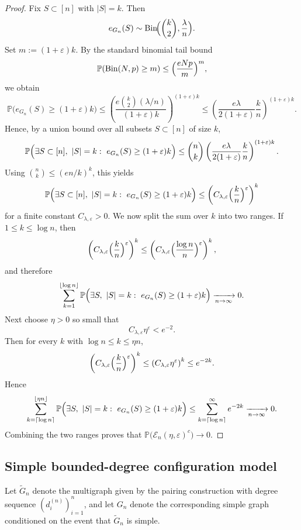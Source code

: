 \documentclass[11pt]{article}
\theoremstyle{remark}
\theoremstyle{plain}
\newcommand{\Pbb}{\mathbb{P}}
\newcommand{\1}{\mathbbm{1}}
\begin{document}
\begin{proof}
Fix \(S\subset[n]\) with \(|S|=k\). Then
\[
e_{G_n}(S)\sim \mathrm{Bin}\!\Bigl(\binom{k}{2},\frac{\lambda}{n}\Bigr).
\]
Set \(m:=(1+\varepsilon)k\). By the standard binomial tail bound
\[
\Pbb(\mathrm{Bin}(N,p)\ge m)\le \Bigl(\frac{eNp}{m}\Bigr)^m,
\]
we obtain
\[
\Pbb\bigl(e_{G_n}(S)\ge (1+\varepsilon)k\bigr)
\le
\left(
\frac{e\binom{k}{2}(\lambda/n)}{(1+\varepsilon)k}
\right)^{(1+\varepsilon)k}
\le
\left(
\frac{e\lambda}{2(1+\varepsilon)}\frac{k}{n}
\right)^{(1+\varepsilon)k}.
\]
Hence, by a union bound over all subsets \(S\subset[n]\) of size \(k\),
\[
\Pbb\Bigl(\exists S\subset[n],\ |S|=k:\ e_{G_n}(S)\ge (1+\varepsilon)k\Bigr)
\le
\binom{n}{k}
\left(
\frac{e\lambda}{2(1+\varepsilon)}\frac{k}{n}
\right)^{(1+\varepsilon)k}.
\]
Using \(\binom{n}{k}\le (en/k)^k\), this yields
\[
\Pbb\Bigl(\exists S\subset[n],\ |S|=k:\ e_{G_n}(S)\ge (1+\varepsilon)k\Bigr)
\le
\left(
C_{\lambda,\varepsilon}\Bigl(\frac{k}{n}\Bigr)^\varepsilon
\right)^k
\]
for a finite constant \(C_{\lambda,\varepsilon}>0\).
We now split the sum over \(k\) into two ranges.
If \(1\le k\le \log n\), then
\[
\left(
C_{\lambda,\varepsilon}\Bigl(\frac{k}{n}\Bigr)^\varepsilon
\right)^k
\le
\left(
C_{\lambda,\varepsilon}\Bigl(\frac{\log n}{n}\Bigr)^\varepsilon
\right)^k,
\]
and therefore
\[
\sum_{k=1}^{\lfloor \log n\rfloor}
\Pbb\Bigl(\exists S,\ |S|=k:\ e_{G_n}(S)\ge (1+\varepsilon)k\Bigr)
\xrightarrow[n\to\infty]{}0.
\]
Next choose \(\eta>0\) so small that
\[
C_{\lambda,\varepsilon}\eta^\varepsilon<e^{-2}.
\]
Then for every \(k\) with \(\log n\le k\le \eta n\),
\[
\left(
C_{\lambda,\varepsilon}\Bigl(\frac{k}{n}\Bigr)^\varepsilon
\right)^k
\le
\left(C_{\lambda,\varepsilon}\eta^\varepsilon\right)^k
\le e^{-2k}.
\]
Hence
\[
\sum_{k=\lceil \log n\rceil}^{\lfloor \eta n\rfloor}
\Pbb\Bigl(\exists S,\ |S|=k:\ e_{G_n}(S)\ge (1+\varepsilon)k\Bigr)
\le
\sum_{k=\lceil \log n\rceil}^{\infty} e^{-2k}
\xrightarrow[n\to\infty]{}0.
\]
Combining the two ranges proves that $\Pbb\bigl(\mathcal E_n(\eta,\varepsilon)^c\bigr)\to 0$.
\end{proof}

\subsection{Simple bounded-degree configuration model}

Let \(\widetilde G_n\) denote the multigraph given by the pairing construction with degree sequence \((d_i^{(n)})_{i=1}^n\), and let \(G_n\) denote the corresponding simple graph conditioned on the event that \(\widetilde G_n\) is simple.
\end{document}
